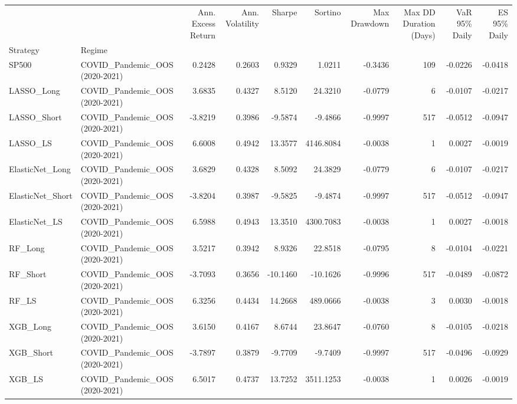 \begin{tabular}{llrrrrrrrr}
\toprule
 &  & Ann. Excess Return & Ann. Volatility & Sharpe & Sortino & Max Drawdown & Max DD Duration (Days) & VaR 95\% Daily & ES 95\% Daily \\
Strategy & Regime &  &  &  &  &  &  &  &  \\
\midrule
SP500 & COVID\_Pandemic\_OOS (2020-2021) & 0.2428 & 0.2603 & 0.9329 & 1.0211 & -0.3436 & 109 & -0.0226 & -0.0418 \\
\cline{1-10}
LASSO\_Long & COVID\_Pandemic\_OOS (2020-2021) & 3.6835 & 0.4327 & 8.5120 & 24.3210 & -0.0779 & 6 & -0.0107 & -0.0217 \\
\cline{1-10}
LASSO\_Short & COVID\_Pandemic\_OOS (2020-2021) & -3.8219 & 0.3986 & -9.5874 & -9.4866 & -0.9997 & 517 & -0.0512 & -0.0947 \\
\cline{1-10}
LASSO\_LS & COVID\_Pandemic\_OOS (2020-2021) & 6.6008 & 0.4942 & 13.3577 & 4146.8084 & -0.0038 & 1 & 0.0027 & -0.0019 \\
\cline{1-10}
ElasticNet\_Long & COVID\_Pandemic\_OOS (2020-2021) & 3.6829 & 0.4328 & 8.5092 & 24.3829 & -0.0779 & 6 & -0.0107 & -0.0217 \\
\cline{1-10}
ElasticNet\_Short & COVID\_Pandemic\_OOS (2020-2021) & -3.8204 & 0.3987 & -9.5825 & -9.4874 & -0.9997 & 517 & -0.0512 & -0.0947 \\
\cline{1-10}
ElasticNet\_LS & COVID\_Pandemic\_OOS (2020-2021) & 6.5988 & 0.4943 & 13.3510 & 4300.7083 & -0.0038 & 1 & 0.0027 & -0.0018 \\
\cline{1-10}
RF\_Long & COVID\_Pandemic\_OOS (2020-2021) & 3.5217 & 0.3942 & 8.9326 & 22.8518 & -0.0795 & 8 & -0.0104 & -0.0221 \\
\cline{1-10}
RF\_Short & COVID\_Pandemic\_OOS (2020-2021) & -3.7093 & 0.3656 & -10.1460 & -10.1626 & -0.9996 & 517 & -0.0489 & -0.0872 \\
\cline{1-10}
RF\_LS & COVID\_Pandemic\_OOS (2020-2021) & 6.3256 & 0.4434 & 14.2668 & 489.0666 & -0.0038 & 3 & 0.0030 & -0.0018 \\
\cline{1-10}
XGB\_Long & COVID\_Pandemic\_OOS (2020-2021) & 3.6150 & 0.4167 & 8.6744 & 23.8647 & -0.0760 & 8 & -0.0105 & -0.0218 \\
\cline{1-10}
XGB\_Short & COVID\_Pandemic\_OOS (2020-2021) & -3.7897 & 0.3879 & -9.7709 & -9.7409 & -0.9997 & 517 & -0.0496 & -0.0929 \\
\cline{1-10}
XGB\_LS & COVID\_Pandemic\_OOS (2020-2021) & 6.5017 & 0.4737 & 13.7252 & 3511.1253 & -0.0038 & 1 & 0.0026 & -0.0019 \\

\end{tabular}
